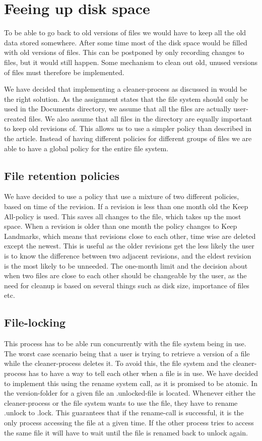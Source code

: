 \documentclass[12pt]{article}
\begin{document}
\section{Feeing up disk space}

To be able to go back to old versions of files we would have to keep
all the old data stored somewhere. After some time most of the disk
space would be filled with old versions of files. This can be
postponed by only recording changes to files, but it would still
happen. Some mechanism to clean out old, unused versions of files must
therefore be implemented.

We have decided that implementing a cleaner-process as discussed in
\cite{319159} would be the right solution. As the assignment states that
the file system should only be used in the Documents directory, we
assume that all the files are actually user-created files. We also
assume that all files in the directory are equally important to keep
old revisions of. This allows us to use a simpler policy than
described in the article. Instead of having different policies for
different groups of files we are able to have a global policy for the
entire file system.

\subsection{File retention policies}
We have decided to use a policy that use a mixture of two different
policies, based on time of the revision. If a revision is less than
one month old the Keep All-policy is used. This saves all changes to
the file, which takes up the most space. When a revision is older than
one month the policy changes to Keep Landmarks, which means that
revisions close to each other, time wise are deleted except the
newest. This is useful as the older revisions get the less likely the
user is to know the difference between two adjacent revisions, and the
eldest revision is the most likely to be unneeded.
The one-month limit and the decision about when two files are close to
each other should be changeable by the user, as the need for cleanup
is based on several things such as disk size, importance of files etc.

\subsection{File-locking}
This process has to be able run concurrently with the file system
being in use. The worst case scenario being that a user is trying to
retrieve a version of a file while the cleaner-process deletes it. To
avoid this, the file system and the cleaner-process has to have a way
to tell each other when a file is in use. We have decided to implement
this using the rename system call, as it is promised to be atomic. In
the version-folder for a given file an .unlocked-file is located.
Whenever either the cleaner-process or the file system wants to use
the file, they have to rename .unlock to .lock. This guarantees that
if the rename-call is successful, it is the only process accessing the
file at a given time. If the other process tries to access the same
file it will have to wait until the file is renamed back to unlock
again.
\end{document}
